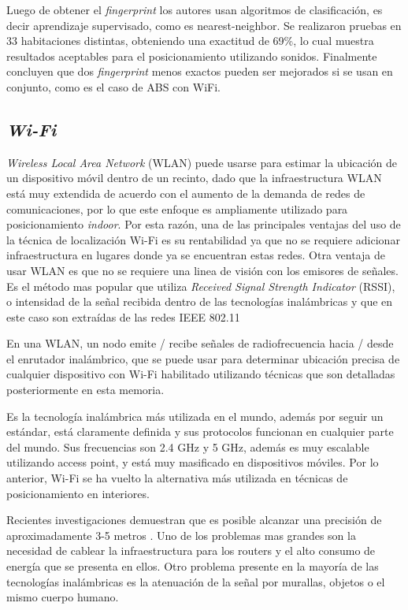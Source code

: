 Luego de obtener el \textit{fingerprint} los autores usan algoritmos de clasificación, es decir aprendizaje supervisado, como es nearest-neighbor. Se realizaron pruebas en 33 habitaciones distintas, obteniendo una exactitud de 69\%, lo cual muestra resultados aceptables para el posicionamiento utilizando sonidos. Finalmente concluyen que dos \textit{fingerprint} menos exactos pueden ser mejorados si se usan en conjunto, como es el caso de ABS con WiFi.

\subsection{\textit{Wi-Fi}}

\textit{Wireless Local Area Network} (WLAN) puede usarse para estimar la ubicación de un dispositivo móvil dentro de un recinto, dado que la infraestructura WLAN está muy extendida de acuerdo con el aumento de la demanda de redes de comunicaciones, por lo que este enfoque es ampliamente utilizado para posicionamiento \textit{indoor}. Por esta razón, una de las principales ventajas del uso de la técnica de localización Wi-Fi es su rentabilidad ya que no se requiere adicionar infraestructura en lugares donde ya se encuentran estas redes. Otra ventaja de usar WLAN es que no se requiere una linea de visión con los emisores de señales. Es el método mas popular que utiliza  \textit{Received Signal Strength Indicator} (RSSI), o intensidad de la señal recibida dentro de las tecnologías inalámbricas y que en este caso son extraídas de las redes IEEE 802.11

En una WLAN, un nodo emite / recibe señales de radiofrecuencia hacia / desde el enrutador inalámbrico, que se puede usar para determinar ubicación precisa de cualquier dispositivo con Wi-Fi habilitado utilizando técnicas que son detalladas posteriormente en esta memoria.

Es la tecnología inalámbrica más utilizada en el mundo, además por seguir un estándar, está claramente definida y sus protocolos funcionan en cualquier parte del mundo. Sus frecuencias son 2.4 GHz y 5 GHz, además es muy escalable utilizando access point, y está muy masificado en dispositivos móviles. Por lo anterior, Wi-Fi se ha vuelto la alternativa más utilizada en técnicas de posicionamiento en interiores.

Recientes investigaciones demuestran que es posible alcanzar una precisión de aproximadamente 3-5 metros \citep{6834746}. Uno de los problemas mas grandes son la necesidad de cablear la infraestructura para los routers y el alto consumo de energía que se presenta en ellos. Otro problema presente en la mayoría de las tecnologías inalámbricas es la atenuación de la señal por murallas, objetos o el mismo cuerpo humano.

